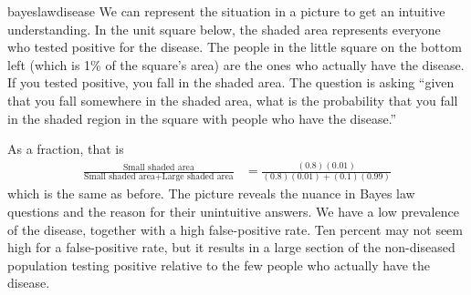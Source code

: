 \begin{answer}{bayeslawdisease}
We can represent the situation in a picture to get an intuitive understanding.
In the unit square below, the shaded area represents everyone who tested positive for the disease.
The people in the little square on the bottom left (which is 1\% of the square's area) are the ones who actually have the disease.
If you tested positive, you fall in the shaded area.
The question is asking ``given that you fall somewhere in the shaded area, what is the probability that you fall in the shaded region in the square with people who have the disease.''
\begin{center}


\end{center}
As a fraction, that is
\begin{align*}
\frac{ \text{Small shaded area} }{ \text{Small shaded area}+\text{Large shaded area} }
&= \frac{ (0.8)(0.01) }{ (0.8)(0.01) + (0.1)(0.99)  }
\end{align*}
which is the same as before.
The picture reveals the nuance in Bayes law questions and the reason for their unintuitive answers.
We have a low prevalence of the disease, together with a high false-positive rate.
Ten percent may not seem high for a false-positive rate, but it results in a large section of the non-diseased population testing positive relative to the few people who actually have the disease.



\end{answer}
